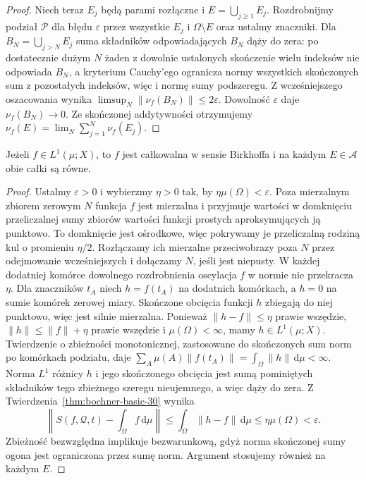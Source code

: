 \begin{proof}
Niech teraz $E_j$ będą parami rozłączne i
$E=\bigcup_{j\ge1}E_j$. Rozdrobnijmy podział $\mathcal P$
dla błędu $\varepsilon$ przez wszystkie $E_j$ i
$\Omega\setminus E$ oraz ustalmy znaczniki.
Dla $B_N=\bigcup_{j>N}E_j$ suma składników
odpowiadających $B_N$ dąży do zera: po dostatecznie
dużym $N$ żaden z dowolnie ustalonych skończenie wielu
indeksów nie odpowiada $B_N$, a kryterium Cauchy'ego
ogranicza normy wszystkich skończonych sum z pozostałych
indeksów, więc i normę sumy podszeregu.
Z wcześniejszego oszacowania wynika
$\limsup_N\|\nu_f(B_N)\|\le2\varepsilon$.
Dowolność $\varepsilon$ daje $\nu_f(B_N)\to0$.
Ze skończonej addytywności otrzymujemy
$\nu_f(E)=\lim_N\sum_{j=1}^N\nu_f(E_j)$.
\end{proof}

\begin{twierdzenie}
\label{thm:bochner-birkhoff-30}
Jeżeli $f\in L^1(\mu;X)$, to $f$ jest całkowalna
w sensie Birkhoffa i na każdym $E\in\mathcal A$
obie całki są równe.
\end{twierdzenie}
\begin{proof}
Ustalmy $\varepsilon>0$ i wybierzmy $\eta>0$ tak, by
$\eta\mu(\Omega)<\varepsilon$.
Poza mierzalnym zbiorem zerowym $N$ funkcja $f$
jest mierzalna i przyjmuje wartości w domknięciu
przeliczalnej sumy zbiorów wartości funkcji prostych
aproksymujących ją punktowo. To domknięcie jest
ośrodkowe, więc pokrywamy je przeliczalną rodziną
kul o promieniu $\eta/2$. Rozłączamy ich mierzalne
przeciwobrazy poza $N$ przez odejmowanie wcześniejszych
i dołączamy $N$, jeśli jest niepusty.
W każdej dodatniej komórce dowolnego rozdrobnienia
oscylacja $f$ w normie nie przekracza $\eta$.
Dla znaczników $t_A$ niech $h=f(t_A)$ na dodatnich
komórkach, a $h=0$ na sumie komórek zerowej miary.
Skończone obcięcia funkcji $h$ zbiegają do niej
punktowo, więc jest silnie mierzalna.
Ponieważ $\|h-f\|\le\eta$ prawie wszędzie,
$\|h\|\le\|f\|+\eta$ prawie wszędzie i
$\mu(\Omega)<\infty$, mamy $h\in L^1(\mu;X)$.
Twierdzenie o zbieżności monotonicznej, zastosowane
do skończonych sum norm po komórkach podziału, daje
$\sum_A\mu(A)\|f(t_A)\|=\int_\Omega\|h\|\,\mathrm d\mu<\infty$.
Norma $L^1$ różnicy $h$ i jego skończonego
obcięcia jest sumą pominiętych składników tego
zbieżnego szeregu nieujemnego, a więc dąży do zera.
Z Twierdzenia~\ref{thm:bochner-basic-30} wynika
\[
 \left\|S(f,\mathcal Q,t)-\int_\Omega f\,\mathrm d\mu\right\|
 \le\int_\Omega\|h-f\|\,\mathrm d\mu
 \le\eta\mu(\Omega)<\varepsilon.
\]
Zbieżność bezwzględna implikuje bezwarunkową, gdyż
norma skończonej sumy ogona jest ograniczona przez
sumę norm. Argument stosujemy również na każdym $E$.
\end{proof}

